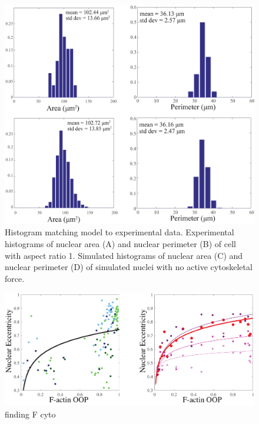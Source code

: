 \begin{figure}[h]
\centering
\captionsetup{width=.9\linewidth}
\includegraphics[width=7in]{Project3/figs/matching_histograms_areaandperim.eps}
\caption{Histogram matching model to experimental data. Experimental histograms of nuclear area (A) and nuclear perimeter (B) of cell with aspect ratio 1. Simulated histograms of nuclear area (C) and nuclear perimeter (D) of simulated nuclei with no active cytoskeletal force.}
\label{fig::histos}
\end{figure}

\begin{figure}[h]
\centering
\captionsetup{width=.9\linewidth}
\includegraphics[width=.9\linewidth]{Project3/figs/EccentricityvsOOP.pdf}
\caption{finding F cyto}
\label{fig::eccopp}
\end{figure}

